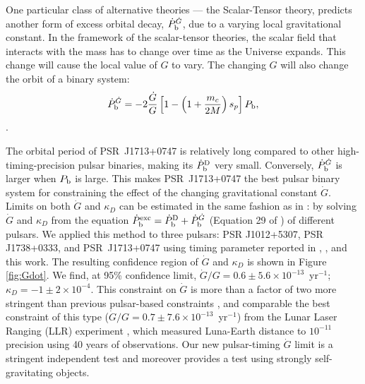 One particular class of alternative theories --- the Scalar-Tensor theory,
predicts another form of excess orbital decay, $\dot{P}_{\rm b}^{\dot{G}}$,
due to a varying
local gravitational constant. In the framework of the scalar-tensor theories,
the scalar field that interacts with the mass has to change over time as the
Universe expands. This change will cause the local value of
$G$ to vary. The changing $G$ will also change
the orbit of a binary system:
\begin{equation}
\dot{P}_{\rm b}^{\dot{G}} = -2 \frac{\dot{G}}{G}
\left[1-\left(1+\frac{m_c}{2M}\right)s_p\right]P_{\rm b},
\end{equation} \citep{dgt88,nor90}.

The orbital period of PSR~J1713+0747 is relatively long compared to other
high-timing-precision pulsar binaries, making its $\dot{P}_{\rm b}^{\rm D}$
very small. Conversely, $\dot{P}_{\rm b}^{\dot{G}}$ is larger when $P_{\rm b}$
is large. This makes PSR~J1713+0747 the best pulsar binary system for constraining
the effect of the changing gravitational constant $\dot{G}$. Limits 
on both $\dot{G}$ and $\kappa_D$ can be estimated in the same fashion as in
\citet{lwj+09}: by solving $\dot{G}$ and $\kappa_D$
from the equation $\dot{P}_{\rm b}^{\rm exc} = \dot{P}_{\rm b}^{\rm D} +
\dot{P}_{\rm b}^{\dot{G}}$ (Equation 29 of \citealt{lwj+09}) of different
pulsars. We applied this method to three pulsars: PSR J1012+5307, PSR
J1738+0333, and PSR~J1713+0747 using timing parameter reported in
\citet{lwj+09}, \citet{fwe+12}, and this work.
The resulting confidence region of $\dot{G}$ and $\kappa_D$ is shown in Figure
\ref{fig:Gdot}.
We find, at 95\% confidence limit, $\dot{G}/G =
0.6\pm5.6\times10^{-13}$~yr$^{-1}$; $\kappa_D=-1\pm2\times10^{-4}$. 
This constraint on $\dot{G}$ is more than a factor of two more stringent than
previous pulsar-based constraints \citep{fwe+12}, and comparable
the best constraint of this type
($\dot{G}/G=0.7\pm7.6\times10^{-13}$~yr$^{-1}$) from the Lunar Laser Ranging
(LLR)
experiment \citep{hmb10}, which measured Luna-Earth distance to $10^{-11}$
precision using 40 years of observations.
Our new pulsar-timing  $\dot{G}$ limit is a stringent independent test
and moreover provides a test using strongly self-gravitating objects.

